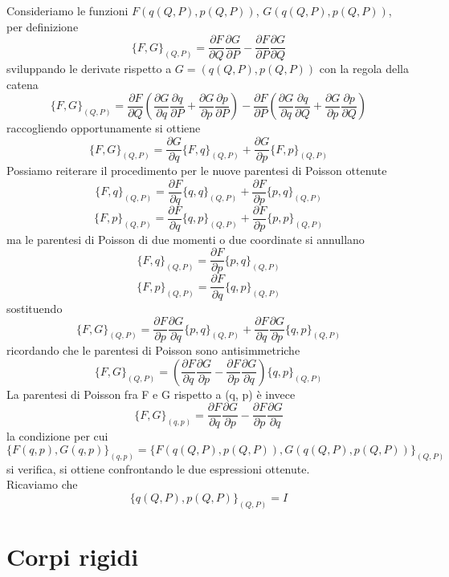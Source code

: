 \documentclass[
10pt, %
a4paper, %
oneside, %
headinclude,footinclude, %
BCOR5mm, %
]{scrartcl}
\begin{document}
\begin{dimostrazione}
	Consideriamo le funzioni \( F(q(Q, P), p(Q, P))\), \(G(q(Q, P), p(Q, P))\), per definizione
	\[\{F, G\}_{(Q, P)} = \frac{\partial F}{\partial Q}\frac{\partial G}{\partial P}- \frac{\partial F}{\partial P}\frac{\partial G}{\partial Q}\]
	sviluppando le derivate rispetto a \(G = (q(Q, P), p(Q, P))\) con la regola della catena 
	\[\{F, G\}_{(Q, P)} = \frac{\partial F}{\partial Q}\left(\frac{\partial G}{\partial q}\frac{\partial q}{\partial P}+\frac{\partial G}{\partial p}\frac{\partial p}{\partial P}\right)- \frac{\partial F}{\partial P}\left(\frac{\partial G}{\partial q}\frac{\partial q}{\partial Q}+\frac{\partial G}{\partial p}\frac{\partial p}{\partial Q}\right)\]
	raccogliendo opportunamente si ottiene
	\[\{F, G\}_{(Q, P)} = \frac{\partial G}{\partial q}\{F, q\}_{(Q, P)}+\frac{\partial G}{\partial p}\{F, p\}_{(Q, P)} \]
	Possiamo reiterare il procedimento per le nuove parentesi di Poisson ottenute
	\[\{F, q\}_{(Q, P)} = \frac{\partial F}{\partial q}\{q, q\}_{(Q, P)} + \frac{\partial F}{\partial p}\{p, q\}_{(Q, P)}\]
	\[\{F, p\}_{(Q, P)} = \frac{\partial F}{\partial q}\{q, p\}_{(Q, P)} + \frac{\partial F}{\partial p}\{p, p\}_{(Q, P)}\]
	ma le parentesi di Poisson di due momenti o due coordinate si annullano
	\[\{F, q\}_{(Q, P)} = \frac{\partial F}{\partial p}\{p, q\}_{(Q, P)}\]
	\[\{F, p\}_{(Q, P)} = \frac{\partial F}{\partial q}\{q, p\}_{(Q, P)}\]
	sostituendo
	\[\{F, G\}_{(Q, P)} = \frac{\partial F}{\partial p}\frac{\partial G}{\partial q}\{p, q\}_{(Q, P)} +
	\frac{\partial F}{\partial q}\frac{\partial G}{\partial p}\{q, p\}_{(Q, P)}\]
	ricordando che le parentesi di Poisson sono antisimmetriche
	\[\{F, G\}_{(Q, P)} = \left(\frac{\partial F}{\partial q}\frac{\partial G}{\partial p}-\frac{\partial F}{\partial p}\frac{\partial G}{\partial q}\right)\{q, p\}_{(Q, P)}\]
	La parentesi di Poisson fra F e G rispetto a (q, p) è invece
	\[\{F, G\}_{(q, p)} = \frac{\partial F}{\partial q}\frac{\partial G}{\partial p}- \frac{\partial F}{\partial p}\frac{\partial G}{\partial q}\]
	la condizione per cui 
	\[\{F(q, p), G(q, p)\}_{(q, p)} = \{F(q(Q, P), p(Q, P)), G(q(Q, P), p(Q, P))\}_{(Q, P)}\]
	si verifica, si ottiene confrontando le due espressioni ottenute.\\
	Ricaviamo che 
	\[\{q(Q, P), p(Q, P)\}_{(Q, P)} = I\]
\end{dimostrazione}

\newpage
\section{Corpi rigidi}
\end{document}
